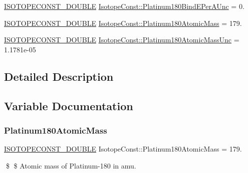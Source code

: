 \begin{DoxyCompactItemize}
\mbox{\hyperlink{group___isotope_const-_macros_ga8f45a7272ce02c0b4c65c44636ed719a}{I\+S\+O\+T\+O\+P\+E\+C\+O\+N\+S\+T\+\_\+\+D\+O\+U\+B\+LE}} \mbox{\hyperlink{group___isotope_const-_platinum-_pt180_ga0a83dcd622839a762ab5fe5200cd9d00}{Isotope\+Const\+::\+Platinum180\+Bind\+E\+Per\+A\+Unc}} = 0.
\item 
\mbox{\hyperlink{group___isotope_const-_macros_ga8f45a7272ce02c0b4c65c44636ed719a}{I\+S\+O\+T\+O\+P\+E\+C\+O\+N\+S\+T\+\_\+\+D\+O\+U\+B\+LE}} \mbox{\hyperlink{group___isotope_const-_platinum-_pt180_ga224aac7fe7b0befa137db24658ff26b0}{Isotope\+Const\+::\+Platinum180\+Atomic\+Mass}} = 179.
\item 
\mbox{\hyperlink{group___isotope_const-_macros_ga8f45a7272ce02c0b4c65c44636ed719a}{I\+S\+O\+T\+O\+P\+E\+C\+O\+N\+S\+T\+\_\+\+D\+O\+U\+B\+LE}} \mbox{\hyperlink{group___isotope_const-_platinum-_pt180_ga5ae1c83081d2d2bfd52fb503496ca527}{Isotope\+Const\+::\+Platinum180\+Atomic\+Mass\+Unc}} = 1.\+1781e-\/05
\end{DoxyCompactItemize}


\subsection{Detailed Description}


\subsection{Variable Documentation}
\mbox{\label{group___isotope_const-_platinum-_pt180_ga224aac7fe7b0befa137db24658ff26b0}} 
\subsubsection{\texorpdfstring{Platinum180\+Atomic\+Mass}{Platinum180AtomicMass}}
{\footnotesize\ttfamily \mbox{\hyperlink{group___isotope_const-_macros_ga8f45a7272ce02c0b4c65c44636ed719a}{I\+S\+O\+T\+O\+P\+E\+C\+O\+N\+S\+T\+\_\+\+D\+O\+U\+B\+LE}} Isotope\+Const\+::\+Platinum180\+Atomic\+Mass = 179.}

\$ \$ Atomic mass of Platinum-\/180 in amu. \mbox{\label{group___isotope_const-_platinum-_pt180_ga5ae1c83081d2d2bfd52fb503496ca527}} 
